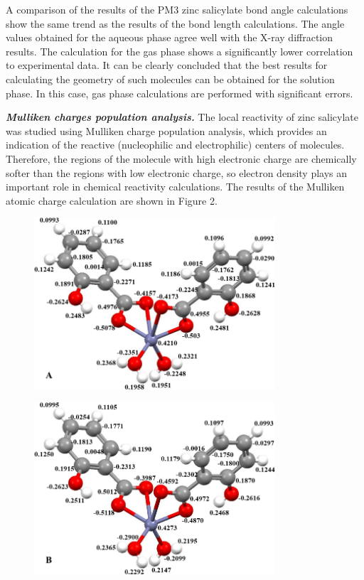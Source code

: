 A comparison of the results of the PM3 zinc salicylate bond angle
calculations show the same trend as the results of the bond length
calculations. The angle values \hspace{0pt}\hspace{0pt}obtained for the
aqueous phase agree well with the X-ray diffraction results. The
calculation for the gas phase shows a significantly lower correlation to
experimental data. It can be clearly concluded that the best results for
calculating the geometry of such molecules can be obtained for the
solution phase. In this case, gas phase calculations are performed with
significant errors.

\emph{{\bfseries Mulliken charges population analysis.}} The local
reactivity of zinc salicylate was studied using Mulliken charge
population analysis, which provides an indication of the reactive
(nucleophilic and electrophilic) centers of molecules. Therefore, the
regions of the molecule with high electronic charge are chemically
softer than the regions with low electronic charge, so electron density
plays an important role in chemical reactivity calculations. The results
of the Mulliken atomic charge calculation are shown in Figure 2.

\begin{figure}[H]
	\centering
	\includegraphics[width=0.8\textwidth]{assets/39}
	\caption*{}
\end{figure}\begin{figure}[H]
	\centering
	\includegraphics[width=0.8\textwidth]{assets/40}
	\caption*{}
\end{figure}

